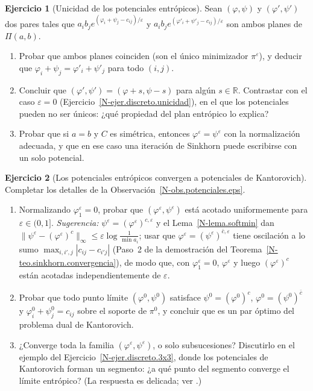 \documentclass[11pt,a4paper]{amsart}
\newcounter{chapter}
\newcommand{\ve}{\varepsilon}
\newcommand{\R}{{\mathbb R}}
\theoremstyle{remark}
\theoremstyle{definition}
\newtheorem{ejercicio}{Ejercicio}[chapter]
\numberwithin{subsection}{section}
\numberwithin{equation}{section}
\begin{document}
\begin{ejercicio}[Unicidad de los potenciales entrópicos]\label{ejer.potenciales.eps.unicidad}
Sean $(\varphi,\psi)$ y $(\varphi',\psi')$ dos pares tales que
$a_ib_je^{(\varphi_i+\psi_j-c_{ij})/\ve}$ y $a_ib_je^{(\varphi'_i+\psi'_j-c_{ij})/\ve}$
son ambos planes de $\Pi(a,b)$.
\begin{enumerate}[label=(\alph*)]
\item Probar que ambos planes coinciden (son el único minimizador
$\pi^\ve$), y deducir que $\varphi_i+\psi_j=\varphi'_i+\psi'_j$ para todo
$(i,j)$.
\item Concluir que $(\varphi',\psi')=(\varphi+s,\psi-s)$ para algún $s\in\R$.
Contrastar con el caso $\ve=0$ (Ejercicio~\ref{N-ejer.discreto.unicidad}), en
el que los potenciales pueden no ser únicos: ¿qué propiedad del plan
entrópico lo explica?
\item Probar que si $a=b$ y $C$ es simétrica, entonces $\varphi^\ve=\psi^\ve$
con la normalización adecuada, y que en ese caso una iteración de Sinkhorn
puede escribirse con un solo potencial.
\end{enumerate}
\end{ejercicio}

\begin{ejercicio}[Los potenciales entrópicos convergen a potenciales de Kantorovich]\label{ejer.potenciales.eps.limite}
Completar los detalles de la Observación~\ref{N-obs.potenciales.eps}.
\begin{enumerate}[label=(\alph*)]
\item Normalizando $\varphi^\ve_1=0$, probar que $(\varphi^\ve,\psi^\ve)$
está acotado uniformemente para $\ve\in(0,1]$. \emph{Sugerencia:}
$\psi^\ve=(\varphi^\ve)^{c,\ve}$ y el Lema~\ref{N-lema.softmin} dan
$\|\psi^\ve-(\varphi^\ve)^c\|_\infty\le\ve\log\frac1{\min a_i}$; usar que
$\varphi^\ve=(\psi^\ve)^{\bar c,\ve}$ tiene oscilación a lo sumo
$\max_{i,i',j}|c_{ij}-c_{i'j}|$ (Paso~2 de la demostración del
Teorema~\ref{N-teo.sinkhorn.convergencia}), de modo que, con
$\varphi^\ve_1=0$, $\varphi^\ve$ y luego $(\varphi^\ve)^c$ están acotadas
independientemente de $\ve$.
\item Probar que todo punto límite $(\varphi^0,\psi^0)$ satisface
$\psi^0=(\varphi^0)^c$, $\varphi^0=(\psi^0)^{\bar c}$ y
$\varphi^0_i+\psi^0_j=c_{ij}$ sobre el soporte de $\pi^0$, y concluir que es
un par óptimo del problema dual de Kantorovich.
\item ¿Converge toda la familia $(\varphi^\ve,\psi^\ve)$, o solo
subsucesiones? Discutirlo en el ejemplo del
Ejercicio~\ref{N-ejer.discreto.3x3}, donde los potenciales de Kantorovich
forman un segmento: ¿a qué punto del segmento converge el límite entrópico?
(La respuesta es delicada; ver \cite{Cominetti1994}.)
\end{enumerate}
\end{ejercicio}
\end{document}
